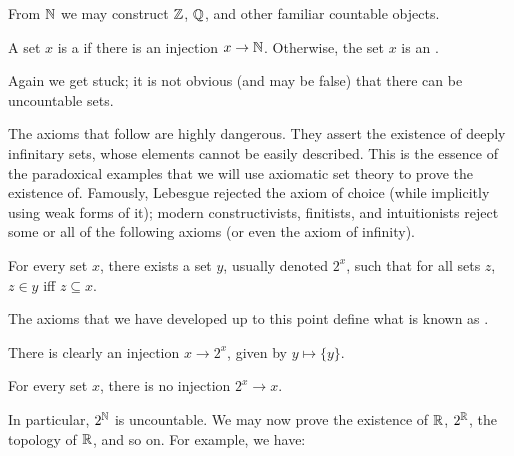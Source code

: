 \begin{subsec}
From $\mathbb{N}$ we may construct $\mathbb{Z}$, $\mathbb{Q}$, and other familiar countable objects.
\end{subsec}

\begin{definition}
A set $x$ is a  if there is an injection $x \to \mathbb{N}$.
Otherwise, the set $x$ is an .
\end{definition}

\begin{subsec}
Again we get stuck; it is not obvious (and may be false) that there can be uncountable sets.
\end{subsec}

\begin{subsec}
The axioms that follow are highly dangerous. They assert the existence of deeply infinitary sets, whose elements cannot be easily described.
This is the essence of the paradoxical examples that we will use axiomatic set theory to prove the existence of.
Famously, Lebesgue rejected the axiom of choice (while implicitly using weak forms of it); modern constructivists, finitists, and intuitionists reject some or all of the following axioms (or even the axiom of infinity).
\end{subsec}

\begin{axiom}
For every set $x$, there exists a set $y$, usually denoted $2^x$, such that for all sets $z$, $z \in y$ iff $z \subseteq x$.
\end{axiom}

\begin{subsec}
The axioms that we have developed up to this point define what is known as .
\end{subsec}

\begin{subsec}
There is clearly an injection $x \to 2^x$, given by $y \mapsto \{y\}$.
\end{subsec}

\begin{theorem}
For every set $x$, there is no injection $2^{x} \to x$.
\end{theorem}

\begin{subsec}
In particular, $2^{\mathbb{N}}$ is uncountable.
We may now prove the existence of $\mathbb{R}$, $2^{\mathbb{R}}$, the topology of $\mathbb{R}$, and so on. For example, we have:
\end{subsec}

